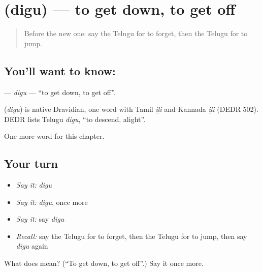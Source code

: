 \section[\texorpdfstring{\te{దిగు} (digu)}{దిగు (digu)}]{ (digu) — to get down, to get off}

\label{lesson:TE-C145-digu}



\begin{quote}
Before the new one: say the Telugu for to forget, then the Telugu for to jump.
\end{quote}

\subsection*{You'll want to know: }
\textbf{} — \emph{digu} — \textquotedblleft{}to get down, to get off\textquotedblright{}.

\begin{cousinweb}
\textbf{} (\emph{digu}) is native Dravidian, one word with Tamil \emph{iḻi} and Kannada \emph{iḻi} (DEDR 502). DEDR lists Telugu \emph{digu}, \textquotedblleft{}to descend, alight\textquotedblright{}.
\end{cousinweb}

\begin{grammarlens}[title={What you've built}]
One more word for this chapter.
\end{grammarlens}

\subsection*{Your turn}
\begin{itemize}
\raggedright
  \item \emph{Say it:} \emph{digu}
  \item \emph{Say it:} \emph{digu}, once more
  \item \emph{Say it:} say \emph{digu}
  \item \emph{Recall:} say the Telugu for to forget, then the Telugu for to jump, then say \emph{digu} again
\end{itemize}

\begin{tcolorbox}[breakable,colback=teal!4,colframe=teal!35!black,title={Before you move on}]
What does  mean? (\textquotedblleft{}To get down, to get off\textquotedblright{}.) Say it once more.
\end{tcolorbox}
